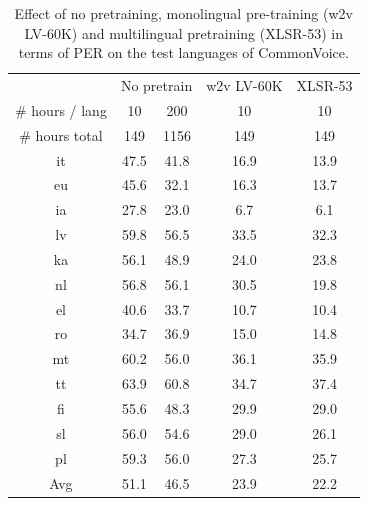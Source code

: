\begin{table}[t]
\caption{Effect of no pretraining, monolingual pre-training (w2v LV-60K) and multilingual pretraining (XLSR-53) in terms of PER on the test languages of CommonVoice. \label{tab:cv_res_abl1}}
\begin{center}
\begin{tabular}{@{}ccccc@{}}
\toprule
  & \multicolumn{2}{c}{No pretrain} & w2v LV-60K & XLSR-53   \\
 \# hours / lang & 10 & 200 & 10 & 10 \\
 \# hours total & 149 & 1156 & 149 & 149 \\
\midrule
it       & 47.5   & 41.8      & 16.9          & 13.9   \\
eu       & 45.6   & 32.1      & 16.3          & 13.7             \\
ia       & 27.8      & 23.0               & 6.7     & 6.1      \\
lv       & 59.8      & 56.5               & 33.5    & 32.3    \\
ka       & 56.1      & 48.9               & 24.0    & 23.8    \\
nl       & 56.8      & 56.1               & 30.5    & 19.8    \\
el       & 40.6      & 33.7               & 10.7    & 10.4             \\
ro       & 34.7      & 36.9               & 15.0    & 14.8             \\
mt       & 60.2      & 56.0               & 36.1    & 35.9    \\
tt       & 63.9   & 60.8      & 34.7          & 37.4             \\
fi       & 55.6      & 48.3               & 29.9    & 29.0              \\
sl       & 56.0   & 54.6      & 29.0          & 26.1   \\
pl       & 59.3      & 56.0               & 27.3    & 25.7      \\
\midrule
Avg & 51.1&	46.5&	23.9&22.2
\\
\bottomrule
\end{tabular}
\end{center}
\end{table}